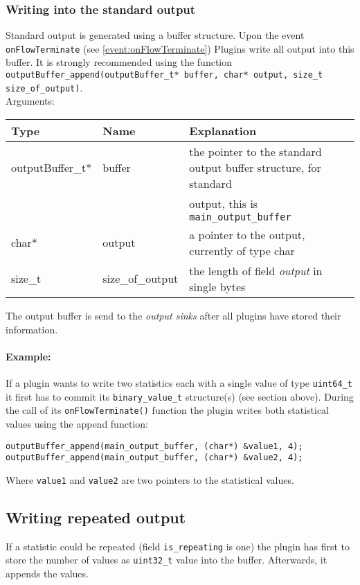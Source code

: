 \documentclass[documentation]{subfiles}
\begin{document}
\subsubsection{Writing into the standard output}
Standard output is generated using a buffer structure. Upon the event {\tt onFlowTerminate} (see \ref{event:onFlowTerminate}) Plugins write all output into this buffer. It is strongly recommended using the function {\tt outputBuffer\_append(outputBuffer\_t* buffer, char* output, size\_t size\_of\_output)}.\\
Arguments:
\begin{longtable}{lll}
    \toprule
    {\bf Type} & {\bf Name} & {\bf Explanation} \\
    \midrule\endhead%
    outputBuffer\_t* & buffer & the pointer to the standard output buffer structure, for standard\\ & & output, this is {\tt main\_output\_buffer}\\
    char* & output & a pointer to the output, currently of type char \\
    size\_t & size\_of\_output & the length of field {\em output} in single bytes \\
    \bottomrule
\end{longtable}
The output buffer is send to the {\em output sinks} after all plugins have stored their information.

\paragraph{Example:}
If a plugin wants to write two statistics each with a single value of type {\tt uint64\_t} it first has to commit its {\tt binary\_value\_t} structure(s) (see section above). During the call of its {\tt onFlowTerminate()} function the plugin writes both statistical values using the append function:
\begin{figure*}[!ht]
\centering
\begin{lstlisting}
outputBuffer_append(main_output_buffer, (char*) &value1, 4);
outputBuffer_append(main_output_buffer, (char*) &value2, 4);
\end{lstlisting}
\end{figure*}

Where {\tt value1} and {\tt value2} are two pointers to the statistical values.

\subsection{Writing repeated output}
If a statistic could be repeated (field {\tt is\_repeating} is one) the plugin has first to store the number of values as {\tt uint32\_t} value into the buffer. Afterwards, it appends the values.
\end{document}
